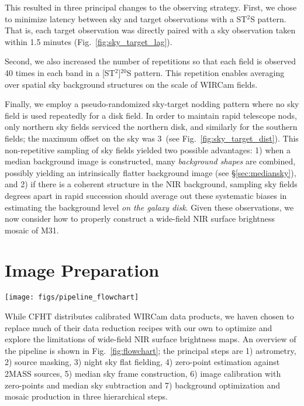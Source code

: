 \documentclass[iop,tighten]{emulateapj}
\newcommand{\sw}[1]{\textit{#1}} %
\newcommand{\iiwione}{\sw{`I`iwi}}
\newcommand{\androids}{\textsc{androids}}
\newcommand{\Fig}[1]{Fig.~\ref{fig:#1}}  %
\newcommand{\Sec}[1]{\S\ref{sec:#1}}  %
\begin{document}
This resulted in three principal changes to the observing strategy. First, we chose to minimize latency between sky and target observations with a ST$^2$S pattern. That is, each target observation was directly paired with a sky observation taken within 1.5 minutes (\Fig{sky_target_lag}).

Second, we also increased the number of repetitions so that each field is observed 40 times in each band in a [ST$^2$]$^{20}$S pattern. This repetition enables averaging over spatial sky background structures on the scale of WIRCam fields.

Finally, we employ a pseudo-randomized sky-target nodding pattern where no sky field is used repeatedly for a disk field.
In order to maintain rapid telescope nods, only northern sky fields serviced the northern disk, and similarly for the southern fields; the maximum offset on the sky was 3\arcdeg\ (see \Fig{sky_target_dist}).
This non-repetitive sampling of sky fields yielded two possible advantages: 1) when a median background image is constructed, many \emph{background shapes} are combined, possibly yielding an intrinsically flatter background image (see \Sec{mediansky}), and 2) if there is a coherent structure in the NIR background, sampling sky fields degrees apart in rapid succession should average out these systematic biases in estimating the background level \emph{on the galaxy disk}.
Given these observations, we now consider how to properly construct a wide-field NIR surface brightness mosaic of M31.

\section{Image Preparation}
\label{sec:reduction}

\begin{figure*}[t]
\centering
\texttt{[image: figs/pipeline\_flowchart]}
\caption{Flowchart representation of the \androids\ WIRCam pipeline, from receipt of CFHT \iiwione\ data products to rendering of M31 mosaics.}
\label{fig:flowchart}
\end{figure*}

While CFHT distributes calibrated WIRCam data products, we haven chosen to replace much of their data reduction recipes with our own to optimize and explore the limitations of wide-field NIR surface brightness maps.
An overview of the pipeline is shown in \Fig{flowchart}; the principal steps are 1) astrometry, 2) source masking, 3) night sky flat fielding, 4) zero-point estimation against 2MASS sources, 5) median sky frame construction, 6) image calibration with zero-points and median sky subtraction and 7) background optimization and mosaic production in three hierarchical steps.
\end{document}
